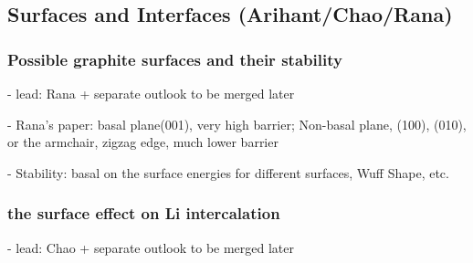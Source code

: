 \documentclass[journal=jacsat,manuscript=article]{achemso}
\begin{document}




\subsection{Surfaces and Interfaces (Arihant/Chao/Rana)}
\label{sec:anodes_surfaces_interfaces}

\subsubsection{Possible graphite surfaces and their stability}
- lead: Rana + separate outlook to be merged later

- Rana's paper: {basal plane(001), very high barrier}; {Non-basal plane, (100), (010), or the armchair, zigzag edge, much lower barrier}
    
- Stability: basal on the surface energies for different surfaces, Wuff Shape, etc.

\subsubsection{the surface effect on Li intercalation}
- lead: Chao + separate outlook to be merged later
\end{document}
